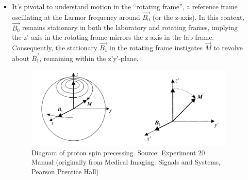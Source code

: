 \documentclass{article}
\begin{document}
\begin{itemize}
    \item It's pivotal to understand motion in the “rotating frame”, a reference frame oscillating at the Larmor frequency around \( \vec{B_0} \) (or the z-axis). In this context, \( \vec{B_0} \) remains stationary in both the laboratory and rotating frames, implying the z'-axis in the rotating frame mirrors the z-axis in the lab frame. Consequently, the stationary \( \vec{B_1} \) in the rotating frame instigates \( \vec{M} \) to revolve about \( \vec{B_1} \), remaining within the z'y'-plane.
    \begin{figure}[h]
    \centering
    \includegraphics[scale = 0.2]{../images/diagram1}
    \caption{Diagram of proton spin precessing. Source: Experiment 20 Manual (originally from Medical Imaging: Signals and Systems, Pearson Prentice Hall)}
    \label{fig:diagram1}
    \end{figure}
\end{itemize}
\end{document}
